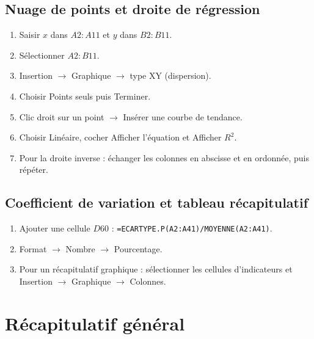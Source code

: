 \documentclass[11pt,a4paper]{article}
\newcommand{\fc}[1]{\textcolor{calcform}{\texttt{#1}}}
\begin{document}
\subsection{Nuage de points et droite de régression}

\begin{enumerate}[label=\textbf{\arabic*.}]
  \item Saisir \( x \) dans \( A2:A11 \) et \( y \) dans \( B2:B11 \).
  \item Sélectionner \( A2:B11 \).
  \item \textsf{Insertion \(\to\) Graphique} \(\to\) type
        \textsf{XY (dispersion)}.
  \item Choisir \textsf{Points seuls} puis \textsf{Terminer}.
  \item Clic droit sur un point \(\to\) \textsf{Insérer une courbe de tendance}.
  \item Choisir \textsf{Linéaire}, cocher
        \textsf{Afficher l'équation} et \textsf{Afficher \( R^2 \)}.
  \item Pour la droite inverse : échanger les colonnes en abscisse
        et en ordonnée, puis répéter.
\end{enumerate}

\subsection{Coefficient de variation et tableau récapitulatif}

\begin{enumerate}[label=\textbf{\arabic*.}]
  \item Ajouter une cellule \( D60 \) : \fc{=ECARTYPE.P(A2:A41)/MOYENNE(A2:A41)}.
  \item Format \(\to\) \textsf{Nombre} \(\to\) \textsf{Pourcentage}.
  \item Pour un récapitulatif graphique : sélectionner les
        cellules d'indicateurs et \textsf{Insertion \(\to\) Graphique
        \(\to\) Colonnes}.
\end{enumerate}

\section{Récapitulatif général}
\end{document}
